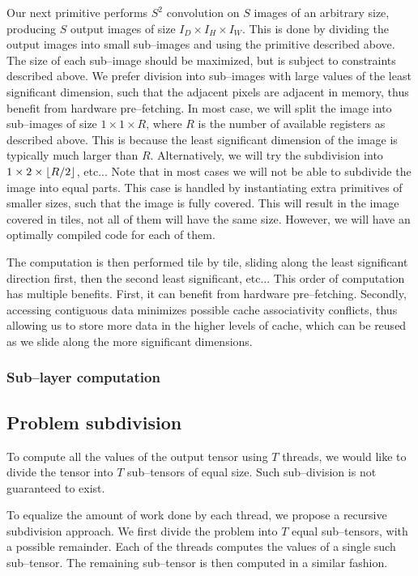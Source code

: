   Our next primitive performs $S^2$ convolution on $S$ images of an
  arbitrary size, producing $S$ output images of size $I_D \times I_H
  \times I_W$.  This is done by dividing the output images into small
  sub--images and using the primitive described above.  The size of
  each sub--image should be maximized, but is subject to constraints
  described above.  We prefer division into sub--images with large
  values of the least significant dimension, such that the adjacent
  pixels are adjacent in memory, thus benefit from hardware
  pre--fetching.  In most case, we will split the image into
  sub--images of size $1 \times 1 \times R$, where $R$ is the number
  of available registers as described above.  This is because the
  least significant dimension of the image is typically much larger
  than $R$.  Alternatively, we will try the subdivision into $1 \times
  2 \times \lfloor R/2\rfloor$, etc...  Note that in most cases we will not
  be able to subdivide the image into equal parts.  This case is
  handled by instantiating extra primitives of smaller sizes, such
  that the image is fully covered.  This will result in the image
  covered in tiles, not all of them will have the same size.  However,
  we will have an optimally compiled code for each of them.

  The computation is then performed tile by tile, sliding along the
  least significant direction first, then the second least
  significant, etc...  This order of computation has multiple
  benefits.  First, it can benefit from hardware pre--fetching.
  Secondly, accessing contiguous data minimizes possible cache
  associativity conflicts, thus allowing us to store more data in the
  higher levels of cache, which can be reused as we slide along the
  more significant dimensions.

  \subsubsection{Sub--layer computation}



  \subsection{Problem subdivision}

  To compute all the values of the output
  tensor using $T$ threads, we would like to divide the tensor into
  $T$ sub--tensors of equal size.  Such sub--division is not
  guaranteed to exist.

  To equalize the amount of work done by each thread, we propose a
  recursive subdivision approach.  We first divide the problem into
  $T$ equal sub--tensors, with a possible remainder.  Each of the
  threads computes the values of a single such sub--tensor.  The
  remaining sub--tensor is then computed in a similar fashion.

